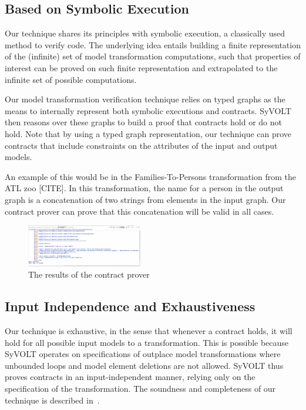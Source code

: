 \subsection{Based on Symbolic Execution}

Our technique shares its principles with symbolic execution, a
classically used method to verify code. The underlying idea entails building a
finite representation of the (infinite) set of model transformation
computations, such that properties of interest can be proved on such finite
representation and extrapolated to the infinite set of possible computations.

Our model transformation verification technique relies on typed graphs as the
means to internally represent both symbolic executions and contracts. SyVOLT
then reasons over these graphs to build a proof that contracts hold or do not
hold. Note that by using a typed graph representation, our technique can prove
contracts that include constraints on the attributes of the input and output
models. 

 An example of this would be in the
Families-To-Persons transformation from the ATL zoo [CITE]. In this transformation, the name for a person in the
output graph is a concatenation of two strings  from elements in the input graph. Our contract prover
can prove that this concatenation will be valid in all cases.

\begin{figure}
\centering
\includegraphics[width=0.45\textwidth]{figures/output}
\caption{The results of the contract prover}
\label{fig:output}
\end{figure}

\subsection{Input Independence and Exhaustiveness} 

Our technique is exhaustive, in the sense that whenever a contract holds, it
will hold for all possible input models to a transformation. This is possible
because SyVOLT operates on specifications of outplace model transformations
where unbounded loops and model element deletions are not allowed. SyVOLT thus proves
contracts in an input-independent manner, relying only on the specification of the
transformation. The soundness and completeness of our technique is described
in~\cite{Lucio2014}.

